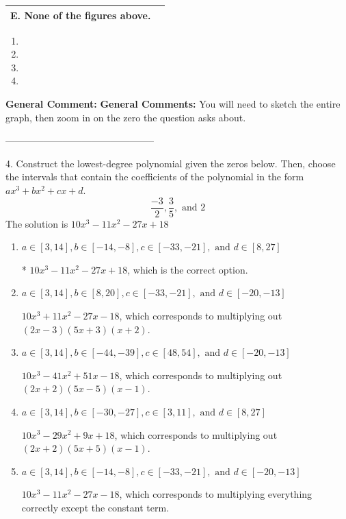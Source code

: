 \documentclass{extbook}[14pt]
\begin{document}
\begin{tabular}{|c|c|}
\hline 
 E. None of the figures above. & \tabularnewline 
\hline 
 \end{tabular} 
 
\begin{enumerate}[label=\Alph*.] 
\item   
\item   
\item   
\item   
\end{enumerate} 
 
\textbf{General Comment:} \textbf{General Comments:} You will need to sketch the entire graph, then zoom in on the zero the question asks about. 

-----------------------------------------------

4. Construct the lowest-degree polynomial given the zeros below. Then, choose the intervals that contain the coefficients of the polynomial in the form $ax^3+bx^2+cx+d$.
\[ \frac{-3}{2}, \frac{3}{5}, \text{ and } 2 \] 
The solution is $ 10x^{3} -11 x^{2} -27 x + 18 $ 

\begin{enumerate}[label=\Alph*.] 
\item $ a \in [3, 14], b \in [-14, -8], c \in [-33, -21], \text{ and } d \in [8, 27] $ 

 * $10x^{3} -11 x^{2} -27 x + 18$, which is the correct option. 
\item $ a \in [3, 14], b \in [8, 20], c \in [-33, -21], \text{ and } d \in [-20, -13] $ 

 $10x^{3} +11 x^{2} -27 x -18$, which corresponds to multiplying out $(2x -3)(5x + 3)(x + 2)$. 
\item $ a \in [3, 14], b \in [-44, -39], c \in [48, 54], \text{ and } d \in [-20, -13] $ 

 $10x^{3} -41 x^{2} +51 x -18$, which corresponds to multiplying out $(2x + 2)(5x -5)(x -1)$. 
\item $ a \in [3, 14], b \in [-30, -27], c \in [3, 11], \text{ and } d \in [8, 27] $ 

 $10x^{3} -29 x^{2} +9 x + 18$, which corresponds to multiplying out $(2x + 2)(5x + 5)(x -1)$. 
\item $ a \in [3, 14], b \in [-14, -8], c \in [-33, -21], \text{ and } d \in [-20, -13] $ 

 $10x^{3} -11 x^{2} -27 x -18$, which corresponds to multiplying everything correctly except the constant term. 
\end{enumerate} 
 
\end{document}

